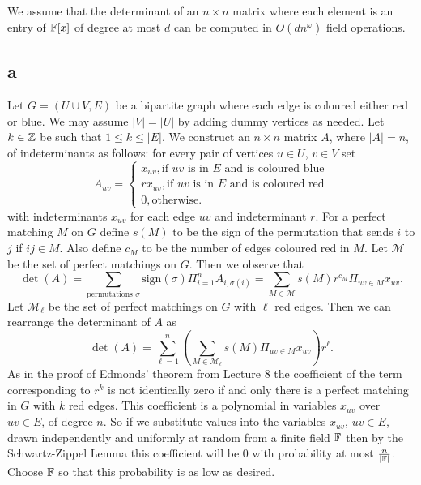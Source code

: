 \documentclass[letterpaper,12pt,oneside,onecolumn]{article}
\newcommand{\cM}{\mathcal{M}} \newcommand{\cN}{\mathcal{N}}
\begin{document}
\section{}
\paragraph{}
We assume that the determinant of an $n \times n$ matrix where each element is an entry of $\mathbb{F}[x]$ of degree at most $d$ can be computed in $O(dn^\omega)$ field operations.
\subsection{a}
Let $G=(U\cup V, E)$ be a bipartite graph where each edge is coloured either red or blue. We may assume $|V| = |U|$ by adding dummy vertices as needed. Let $k \in \mathbb{Z}$ be such that $1 \leq k \leq |E|$. We construct an $n\times n$ matrix $A$, where $|A| = n$, of indeterminants as follows: for every pair of vertices $u \in U$, $v\in V$ set
$$A_{uv} = \begin{cases}
x_{uv}, \text{if $uv$ is in $E$ and is coloured blue} \\
rx_{uv}, \text{if $uv$ is in $E$ and is coloured red} \\
0, \text{otherwise}.
\end{cases}$$
with indeterminants $x_{uv}$ for each edge $uv$ and indeterminant $r$. For a perfect matching $M$ on $G$ define $s(M)$ to be the sign of the permutation that sends $i$ to $j$ if $ij \in M$. Also define $c_M$ to be the number of edges coloured red in $M$. Let $\cM$ be the set of perfect matchings on $G$. Then we observe that
$$\det(A) = \sum_{\text{permutations } \sigma}\text{sign}(\sigma) \Pi_{i=1}^n A_{i,\sigma(i)} = \sum_{M \in \cM} s(M) r^{c_M}\Pi_{uv \in M}x_{uv}.$$
Let $\cM_\ell$ be the set of perfect matchings on $G$ with $\ell$ red edges. Then we can rearrange the determinant of $A$ as
$$\det(A) = \sum_{\ell = 1}^n (\sum_{M \in \cM_\ell} s(M)\Pi_{uv \in M}x_{uv})r^\ell.$$
As in the proof of Edmonds' theorem from Lecture $8$ the coefficient of the term corresponding to $r^k$ is not identically zero if and only there is a perfect matching in $G$ with $k$ red edges. This coefficient is a polynomial in variables $x_{uv}$ over $uv \in E$, of degree $n$. So if we substitute values into the variables $x_{uv}$, $uv \in E$, drawn independently and uniformly at random from a finite field $\mathbb{F}$ then by the Schwartz-Zippel Lemma this coefficient will be $0$ with probability at most $\frac{n}{|\mathbb{F}|}$. Choose $\mathbb{F}$ so that this probability is as low as desired.
\end{document}
